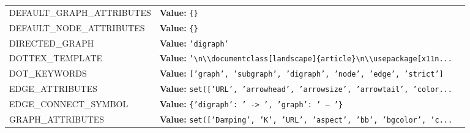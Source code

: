 \begin{longtable}{|p{\varnamewidth}|p{\vardescrwidth}|l}
\cline{1-2}
\raggedright D\-E\-F\-A\-U\-L\-T\-\_\-G\-R\-A\-P\-H\-\_\-A\-T\-T\-R\-I\-B\-U\-T\-E\-S\- & \raggedright \textbf{Value:} 
{\tt \texttt{\{}\texttt{\}}}&\\
\cline{1-2}
\raggedright D\-E\-F\-A\-U\-L\-T\-\_\-N\-O\-D\-E\-\_\-A\-T\-T\-R\-I\-B\-U\-T\-E\-S\- & \raggedright \textbf{Value:} 
{\tt \texttt{\{}\texttt{\}}}&\\
\cline{1-2}
\raggedright D\-I\-R\-E\-C\-T\-E\-D\-\_\-G\-R\-A\-P\-H\- & \raggedright \textbf{Value:} 
{\tt \texttt{'}\texttt{digraph}\texttt{'}}&\\
\cline{1-2}
\raggedright D\-O\-T\-2\-T\-E\-X\-\_\-T\-E\-M\-P\-L\-A\-T\-E\- & \raggedright \textbf{Value:} 
{\tt \texttt{'}\texttt{{\textbackslash}n{\textbackslash}{\textbackslash}documentclass[landscape]\{article\}{\textbackslash}n{\textbackslash}{\textbackslash}usepackage[x11n}\texttt{...}}&\\
\cline{1-2}
\raggedright D\-O\-T\-\_\-K\-E\-Y\-W\-O\-R\-D\-S\- & \raggedright \textbf{Value:} 
{\tt \texttt{[}\texttt{'}\texttt{graph}\texttt{'}\texttt{, }\texttt{'}\texttt{subgraph}\texttt{'}\texttt{, }\texttt{'}\texttt{digraph}\texttt{'}\texttt{, }\texttt{'}\texttt{node}\texttt{'}\texttt{, }\texttt{'}\texttt{edge}\texttt{'}\texttt{, }\texttt{'}\texttt{strict}\texttt{'}\texttt{]}}&\\
\cline{1-2}
\raggedright E\-D\-G\-E\-\_\-A\-T\-T\-R\-I\-B\-U\-T\-E\-S\- & \raggedright \textbf{Value:} 
{\tt \texttt{set([}\texttt{'}\texttt{URL}\texttt{'}\texttt{, }\texttt{'}\texttt{arrowhead}\texttt{'}\texttt{, }\texttt{'}\texttt{arrowsize}\texttt{'}\texttt{, }\texttt{'}\texttt{arrowtail}\texttt{'}\texttt{, }\texttt{'}\texttt{color}\texttt{...}}&\\
\cline{1-2}
\raggedright E\-D\-G\-E\-\_\-C\-O\-N\-N\-E\-C\-T\-\_\-S\-Y\-M\-B\-O\-L\- & \raggedright \textbf{Value:} 
{\tt \texttt{\{}\texttt{'}\texttt{digraph}\texttt{'}\texttt{: }\texttt{'}\texttt{ -{\textgreater} }\texttt{'}\texttt{, }\texttt{'}\texttt{graph}\texttt{'}\texttt{: }\texttt{'}\texttt{ -- }\texttt{'}\texttt{\}}}&\\
\cline{1-2}
\raggedright G\-R\-A\-P\-H\-\_\-A\-T\-T\-R\-I\-B\-U\-T\-E\-S\- & \raggedright \textbf{Value:} 
{\tt \texttt{set([}\texttt{'}\texttt{Damping}\texttt{'}\texttt{, }\texttt{'}\texttt{K}\texttt{'}\texttt{, }\texttt{'}\texttt{URL}\texttt{'}\texttt{, }\texttt{'}\texttt{aspect}\texttt{'}\texttt{, }\texttt{'}\texttt{bb}\texttt{'}\texttt{, }\texttt{'}\texttt{bgcolor}\texttt{'}\texttt{, }\texttt{'}\texttt{c}\texttt{...}}&\\
\cline{1-2}

\end{longtable}
